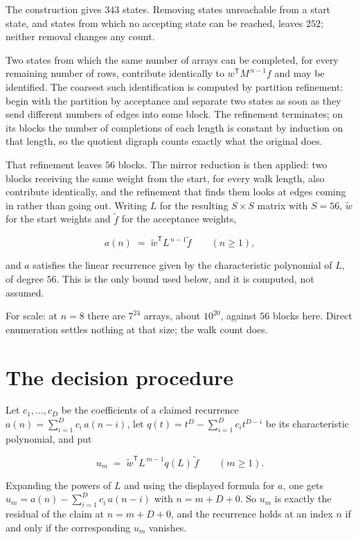 \documentclass[11pt]{article}
\theoremstyle{definition}
\begin{document}
The construction gives $343$ states. Removing states unreachable from a start state, and states from which no accepting state can be reached, leaves $252$; neither removal changes any count.

Two states from which the same number of arrays can be completed, for every remaining number of rows, contribute identically to $w^{\mathsf T}M^{\,n-1}f$ and may be identified. The coarsest such identification is computed by partition refinement: begin with the partition by acceptance and separate two states as soon as they send different numbers of edges into some block. The refinement terminates; on its blocks the number of completions of each length is constant by induction on that length, so the quotient digraph counts exactly what the original does.

That refinement leaves $56$ blocks. The mirror reduction is then applied: two blocks receiving the same weight from the start, for every walk length, also contribute identically, and the refinement that finds them looks at edges coming in rather than going out. Writing $L$ for the resulting $S \times S$ matrix with $S = 56$, $\tilde w$ for the start weights and $\tilde f$ for the acceptance weights,

\[a(n) \;=\; \tilde w^{\mathsf T} L^{\,n-1} \tilde f \qquad (n \ge 1),\]

and $a$ satisfies the linear recurrence given by the characteristic polynomial of $L$, of degree $56$. This is the only bound used below, and it is computed, not assumed.

For scale: at $n = 8$ there are $7^{24}$ arrays, about $10^{20}$, against $56$ blocks here. Direct enumeration settles nothing at that size; the walk count does.

\section{The decision procedure}

Let $c_1,\dots,c_D$ be the coefficients of a claimed recurrence $a(n) = \sum_{i=1}^{D} c_i\,a(n-i)$, let $q(t) = t^{D} - \sum_{i=1}^{D} c_i t^{D-i}$ be its characteristic polynomial, and put

\[u_m \;=\; \tilde w^{\mathsf T} L^{\,m-1} q(L)\,\tilde f \qquad (m \ge 1).\]

Expanding the powers of $L$ and using the displayed formula for $a$, one gets $u_m = a(n) - \sum_{i=1}^{D} c_i\,a(n-i)$ with $n = m + D + 0$. So $u_m$ is exactly the residual of the claim at $n = m + D + 0$, and the recurrence holds at an index $n$ if and only if the corresponding $u_m$ vanishes.
\end{document}
